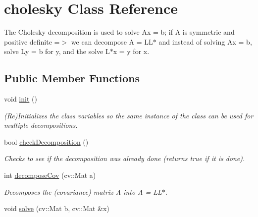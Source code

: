 \hypertarget{classcholesky}{
\section{cholesky Class Reference}
\label{classcholesky}
}


The {\ttfamily Cholesky} decomposition is used to solve Ax = b; if A is symmetric and positive definite =$>$ we can decompose A = LL$\ast$ and instead of solving Ax = b, solve Ly = b for y, and the solve L$\ast$x = y for x.  


\subsection*{Public Member Functions}
\begin{DoxyCompactItemize}
\item 
\hypertarget{classcholesky_a02fd73d861ef2e4aabb38c0c9ff82947}{
void \hyperlink{classcholesky_a02fd73d861ef2e4aabb38c0c9ff82947}{init} ()}
\label{classcholesky_a02fd73d861ef2e4aabb38c0c9ff82947}

\begin{DoxyCompactList}\small\item\em (Re)Initializes the class variables so the same instance of the class can be used for multiple decompositions. \item\end{DoxyCompactList}\item 
\hypertarget{classcholesky_ab13f172a987b3b2d62ec036d11488074}{
bool \hyperlink{classcholesky_ab13f172a987b3b2d62ec036d11488074}{checkDecomposition} ()}
\label{classcholesky_ab13f172a987b3b2d62ec036d11488074}

\begin{DoxyCompactList}\small\item\em Checks to see if the decomposition was already done (returns true if it is done). \item\end{DoxyCompactList}\item 
\hypertarget{classcholesky_aa848358eb025013bd6291c5f849f1807}{
int \hyperlink{classcholesky_aa848358eb025013bd6291c5f849f1807}{decomposeCov} (cv::Mat a)}
\label{classcholesky_aa848358eb025013bd6291c5f849f1807}

\begin{DoxyCompactList}\small\item\em Decomposes the (covariance) matrix A into A = LL$\ast$. \item\end{DoxyCompactList}\item 
\hypertarget{classcholesky_a69e8893e29bb2b14821b8942a1610e3a}{
void \hyperlink{classcholesky_a69e8893e29bb2b14821b8942a1610e3a}{solve} (cv::Mat b, cv::Mat \&x)}
\label{classcholesky_a69e8893e29bb2b14821b8942a1610e3a}


\end{DoxyCompactItemize}
